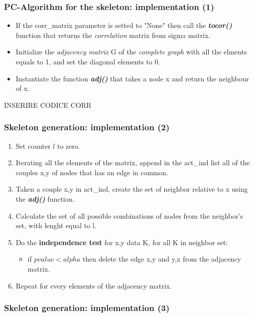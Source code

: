 \documentclass[xcolor ={table,usenames,dvipsnames}]{beamer}
\theoremstyle{definition}
\begin{document}
	
	\begin{frame}
		\frametitle{PC-Algorithm for the skeleton: implementation (1)}
		\begin{itemize}
			\item If the corr\_matrix parameter is setted to "None" then call the \textit{\textbf{tocor()}} function that returns the \textit{correlation} matrix from sigma matrix.
			\item Initialize the \textit{adjacency matrix} G of the \textit{complete graph} with all the elments equals to 1, and set the diagonal elements to 0.
			\item Instantiate the function \textit{\textbf{adj()}} that takes a node x and return the neighbour of x.
		\end{itemize}
		INSERIRE CODICE CORR
	\end{frame}

	\begin{frame}
		\frametitle{Skeleton generation: implementation (2)}
		\begin{enumerate}
			\item Set  counter $l$ to zero.
			\item Iterating all the elements of the matrix, append in the act\_ind list all of the couples x,y of nodes that has an edge in common.
			\item Taken a couple x,y in act\_ind, create the set of neighbor relative to x using the \textit{\textbf{adj()}} function.
			\item Calculate the set of all possible combinations of nodes from the neighbor's set, with lenght equal to l.
			\item Do the \textbf{independence test} for x,y data K, for all K in neighbor set:
			\begin{itemize}
				\item if $pvalue < alpha$ then delete the edge x,y and y,x from the adjacency matrix.
			\end{itemize}
			\item Repeat for every elements of the adjacency matrix.      
		\end{enumerate}
	\end{frame}

	\begin{frame}
		\frametitle{Skeleton generation: implementation (3)}
	\end{frame}

	
\end{document}
